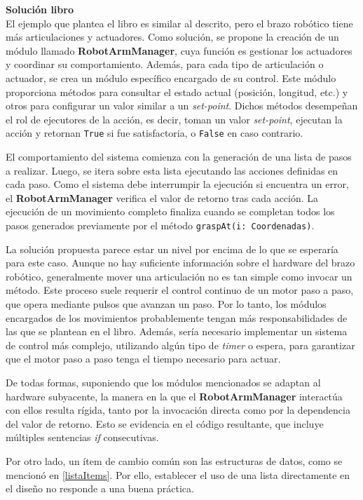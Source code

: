 \noident
\textbf{Solución libro}
\\
\noident
El ejemplo que plantea el libro es similar al descrito, pero el brazo robótico tiene más articulaciones y actuadores. Como solución, se propone la creación de un módulo llamado \textbf{RobotArmManager}, cuya función es gestionar los actuadores y coordinar su comportamiento. Además, para cada tipo de articulación o actuador, se crea un módulo específico encargado de su control. Este módulo proporciona métodos para consultar el estado actual (posición, longitud, etc.) y otros para configurar un valor similar a un \textit{set-point}. Dichos métodos desempeñan el rol de ejecutores de la acción, es decir, toman un valor \textit{set-point}, ejecutan la acción y retornan \verb|True| si fue satisfactoria, o \verb|False| en caso contrario.

El comportamiento del sistema comienza con la generación de una lista de pasos a realizar. Luego, se itera sobre esta lista ejecutando las acciones definidas en cada paso. Como el sistema debe interrumpir la ejecución si encuentra un error, el \textbf{RobotArmManager} verifica el valor de retorno tras cada acción. La ejecución de un movimiento completo finaliza cuando se completan todos los pasos generados previamente por el método \verb|graspAt(i: Coordenadas)|.

La solución propuesta parece estar un nivel por encima de lo que se esperaría para este caso. Aunque no hay suficiente información sobre el hardware del brazo robótico, generalmente mover una articulación no es tan simple como invocar un método. Este proceso suele requerir el control continuo de un motor paso a paso, que opera mediante pulsos que avanzan un paso. Por lo tanto, los módulos encargados de los movimientos probablemente tengan más responsabilidades de las que se plantean en el libro. Además, sería necesario implementar un sistema de control más complejo, utilizando algún tipo de \textit{timer} o espera, para garantizar que el motor paso a paso tenga el tiempo necesario para actuar.

De todas formas, suponiendo que los módulos mencionados se adaptan al hardware subyacente, la manera en la que el \textbf{RobotArmManager} interactúa con ellos resulta rígida, tanto por la invocación directa como por la dependencia del valor de retorno. Esto se evidencia en el código resultante, que incluye múltiples sentencias \textit{if} consecutivas.

Por otro lado, un ítem de cambio común son las estructuras de datos, como se mencionó en \ref{listaItems}. Por ello, establecer el uso de una lista directamente en el diseño no responde a una buena práctica.

